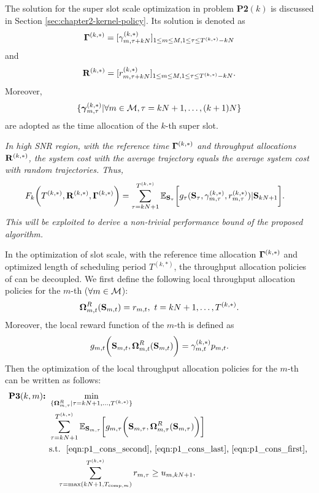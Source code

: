 The solution for the super slot scale optimization in problem \textbf{P2$(k)$} is discussed in Section \ref{sec:chapter2-kernel-policy}.
Its solution is denoted as
$$\mathbf{\Gamma}^{(k,*)}=[\gamma^{(k,*)}_{m,\tau+kN}]_{1 \leq m \leq M, 1 \leq \tau \leq T^{(k,*)}-kN}$$
and
$$\mathbf{R}^{(k,*)}=[r^{(k,*)}_{m,\tau+kN}]_{1 \leq m \leq M, 1 \leq \tau \leq T^{(k,*)}-kN}.$$
Moreover, $$\{ \boldsymbol{\gamma}^{(k,*)}_{m,\tau} | \forall m\in\mathcal{M}, \tau=kN+1,\dots,(k+1)N \}$$ are adopted as the time allocation of the $k$-th super slot.

 {\it In high SNR region, with the reference time $\mathbf{\Gamma}^{(k,*)}$ and throughput allocations $\mathbf{R}^{(k,*)}$, the system cost with the average trajectory equals the average system cost with random trajectories. Thus,
\begin{align*}
F_k &\bigg( T^{(k,*)}, \mathbf{R}^{(k,*)}, \mathbf{\Gamma}^{(k,*)}\bigg) =
\sum_{\tau=kN+1}^{T^{(k,*)}} \mathbb{E}_{\mathbf{S}_{\tau}} \bigg[
            g_{\tau}( \mathbf{S}_{\tau}, \gamma^{(k,*)}_{m,\tau}, r^{(k,*)}_{m,\tau}) | \mathbf{S}_{kN+1}
        \bigg].
\end{align*}
This will be exploited to derive a non-trivial performance bound of the proposed algorithm.}

In the optimization of slot scale, with the reference time allocation $\mathbf{\Gamma}^{(k,*)}$ and optimized length of scheduling period $T^{(k,*)}$, the throughput allocation policies of {\IAVs} can be decoupled. We first define the following local throughput allocation policies for the $m$-th {\IAV} ($\forall m\in\mathcal{M}$):
\begin{align}
    \boldsymbol{\Omega}^{R}_{m,t}( \mathbf{S}_{m,t} ) = r_{m,t},~t=kN+1,\dots,T^{(k,*)}.
\end{align}
Moreover, the local reward function of the $m$-th {\IAV} is defined as
\begin{align}
    g_{m,t}\bigg( \mathbf{S}_{m,t}, \boldsymbol{\Omega}^{R}_{m,t}(\mathbf{S}_{m,t}) \bigg) = \gamma^{(k,*)}_{m,t} p_{m,t}.
\end{align}
Then the optimization of the local throughput allocation policies for the $m$-th {\IAV} can be written as follows:
\begin{align}
    \textbf{P3$(k,m)$:~}
    &\min_{ \{\boldsymbol{\Omega}^{R}_{m,\tau} | \tau=kN+1,\dots,T^{(k,*)} \} }
        \nonumber\\
        &\sum_{\tau=kN+1}^{T^{(k,*)}}
        \mathbb{E}_{\mathbf{S}_{m,\tau}} \bigg[
            g_{m,\tau}\bigg( \mathbf{S}_{m,\tau}, \boldsymbol{\Omega}^{R}_{m,\tau}( \mathbf{S}_{m,\tau} ) \bigg)\nonumber
        \bigg]
    \\\nonumber
    &\text{s.t.~} \text{ \eqref{eqn:p1_cons_second}, \eqref{eqn:p1_cons_last}, \eqref{eqn:p1_cons_first}, } \nonumber\\
    & ~~~ \sum_{ \tau=\max(kN+1,T_{\text{comp},m}) }^{ T^{(k,*)}} r_{m,\tau} \geq {u}_{m,kN+1}.
\end{align}

